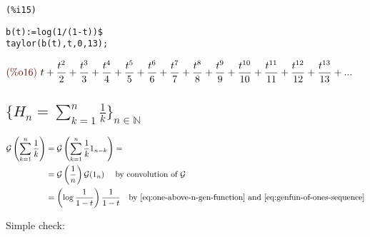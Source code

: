 \noindent
\begin{minipage}[t]{8ex}{\color{red}\bf
\begin{verbatim}
(%i15) 
\end{verbatim}}
\end{minipage}
\begin{minipage}[t]{\textwidth}{\color{blue}
\begin{verbatim}
b(t):=log(1/(1-t))$
taylor(b(t),t,0,13);
\end{verbatim}}
\end{minipage}
\begin{math}\displaystyle
\parbox{8ex}{\color{labelcolor}(\%o16) }
t+\frac{{t}^{2}}{2}+\frac{{t}^{3}}{3}+\frac{{t}^{4}}{4}+\frac{{t}^{5}}{5}+\frac{{t}^{6}}{6}+\frac{{t}^{7}}{7}+\frac{{t}^{8}}{8}+\frac{{t}^{9}}{9}+\frac{{t}^{10}}{10}+\frac{{t}^{11}}{11}+\frac{{t}^{12}}{12}+\frac{{t}^{13}}{13}+...
\end{math}

\subsection{$\{H_n = \sum_{k=1}^{n}{ \frac{1}{k} } \}_{n\in \mathbb{N}
  } $}

\begin{displaymath}
  \begin{split}
    \mathcal{G} \left(\sum_{k=1}^{n}{ \frac{1}{k} } \right) &=
    \mathcal{G} \left(\sum_{k=1}^{n}{ \frac{1}{k} 1_{n-k} } \right) = \\
    &=\mathcal{G} \left(\frac{1}{n}\right) \mathcal{G} (1_n) \quad
    \text{ by
      convolution of }\mathcal{G}\\
    &= \left (\log{ \frac{1}{1-t}}\right) \frac{1}{1-t} \quad \text{by
      \autoref{eq:one-above-n-gen-function} and
      \autoref{eq:genfun-of-ones-sequence}}
  \end{split}
\end{displaymath}

Simple check:

